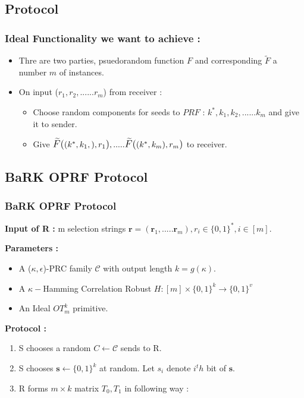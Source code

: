 \documentclass[hyperref={pdfpagelabels=false}]{beamer}
\theoremstyle{remark}
\begin{document}
\subsection{Protocol}

\begin{frame}
\frametitle{Ideal Functionality we want to achieve :}
\begin{itemize}
\item Thre are two parties, psuedorandom function $F$ and corresponding $\widetilde{F}$ a number $m$ of instances.\pause
\item On input ($r_1,r_2,......r_m$) from receiver :
	\begin{itemize}
	\item Choose random components for seeds to $PRF$ : $k^*, k_1, k_2, ......k_m$ and give it to sender.\pause
	\item Give $\mathlarger{\mathlarger{\widetilde{F}(}} \mathlarger{(}  k^*,k_1, \mathlarger{)}, r_1 \mathlarger{\mathlarger{)}},.....\mathlarger{\mathlarger{\widetilde{F}(}} \mathlarger{(}  k^*,k_m \mathlarger{)}, r_m \mathlarger{\mathlarger{)}}$ to receiver.\pause
\end{itemize}	 
\end{itemize} 
\end{frame}

\subsection{BaRK OPRF Protocol}

\begin{frame}
\frametitle{BaRK OPRF Protocol}
\textbf{Input of R :} m selection strings $\mathbf{r} = (\mathbf{r}_1,.....\mathbf{r}_m), r_i \in \{0,1\}^*, i \in [m]$.\par \pause
\textbf{Parameters :}
\begin{itemize}
\item A ($\kappa ,\epsilon$)-PRC family $\mathcal{C}$ with output length $k=g(\kappa)$.\pause
\item A $\kappa-$Hamming Correlation Robust $H:[m] \times \{0,1\}^k \rightarrow \{0,1\}^v$ \pause
\item An Ideal $OT_m^k$ primitive.\pause
\end{itemize}
\textbf{Protocol :}\pause
\begin{enumerate}
\item S chooses a random $C \leftarrow \mathcal{C}$ sends to R.\pause
\item S chooses $\mathbf{s} \leftarrow \{0,1\}^k$ at random. Let $s_i$ denote $i^th$ bit of $\mathbf{s}$.\pause
\item R forms $m \times k$ matrix $T_0, T_1$ in following way :
\end{enumerate}

\end{frame}
\end{document}
